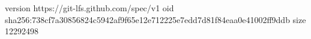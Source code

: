 version https://git-lfs.github.com/spec/v1
oid sha256:738cf7a30856824c5942af9f65e12e712225e7edd7d81f84eaa0e41002ff9ddb
size 12292498
